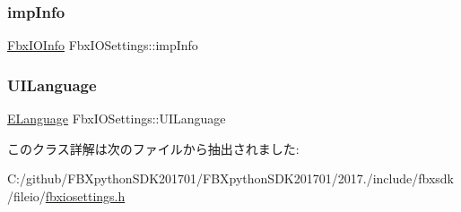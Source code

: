 \mbox{\label{class_fbx_i_o_settings_aa966915ec88f2963202d309e43b12e34}} 
\subsubsection{\texorpdfstring{imp\+Info}{impInfo}}
{\footnotesize\ttfamily \hyperlink{class_fbx_i_o_info}{Fbx\+I\+O\+Info} Fbx\+I\+O\+Settings\+::imp\+Info}

\mbox{\label{class_fbx_i_o_settings_a66b062ff1bbcedce5978358a81ec9026}} 
\subsubsection{\texorpdfstring{U\+I\+Language}{UILanguage}}
{\footnotesize\ttfamily \hyperlink{class_fbx_i_o_settings_a84f2effd8e41c382faa5ca58046f323f}{E\+Language} Fbx\+I\+O\+Settings\+::\+U\+I\+Language}



このクラス詳解は次のファイルから抽出されました\+:\begin{DoxyCompactItemize}
\item 
C\+:/github/\+F\+B\+Xpython\+S\+D\+K201701/\+F\+B\+Xpython\+S\+D\+K201701/2017./include/fbxsdk/fileio/\hyperlink{fbxiosettings_8h}{fbxiosettings.\+h}\end{DoxyCompactItemize}
